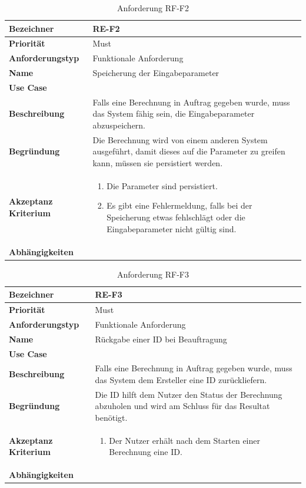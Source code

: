 \begin{table}[ht]
\centering
  \begin{tabular}{ l | p{8cm} }
	\hline
	\rowcolor{gray}
	\textbf{Bezeichner}&	\textbf{RE-F2}\\ \hline
	\textbf{Priorität} 		&	Must\\ \hline
	\textbf{Anforderungstyp}	&	Funktionale Anforderung\\ \hline
	\textbf{Name} 			&	Speicherung der Eingabeparameter\\ \hline
	\textbf{Use Case} 		&	\nameref{table:use_case_1}\\ \hline
	\textbf{Beschreibung} 	&	Falls eine Berechnung in Auftrag gegeben wurde, muss das System fähig sein, die Eingabeparameter abzuspeichern.\\ \hline
	\textbf{Begründung} 		&	Die Berechnung wird von einem anderen System ausgeführt, damit dieses auf die Parameter zu greifen kann, müssen sie persistiert werden.\\ \hline
	\textbf{Akzeptanz Kriterium}	&	\begin{enumerate}
					\item Die Parameter sind persistiert.
					\item Es gibt eine Fehlermeldung, falls bei der Speicherung etwas fehlschlägt oder die Eingabeparameter nicht gültig sind.
					\end{enumerate}
					\\ \hline
	\textbf{Abhängigkeiten} 	&	\\ \hline
  \end{tabular}
   \caption{Anforderung RF-F2}\label{table:req_3}
\end{table}

\begin{table}[ht]
\centering
  \begin{tabular}{ l | p{8cm} }
	\hline
	\rowcolor{gray}
	\textbf{Bezeichner}&	\textbf{RE-F3}\\ \hline
	\textbf{Priorität} 		&	Must\\ \hline
	\textbf{Anforderungstyp}	&	Funktionale Anforderung\\ \hline
	\textbf{Name} 			&	Rückgabe einer ID bei Beauftragung\\ \hline
	\textbf{Use Case} 		&	\nameref{table:use_case_1}\\ \hline
	\textbf{Beschreibung} 	&	Falls eine Berechnung in Auftrag gegeben wurde, muss das System dem Ersteller eine ID zurückliefern.\\ \hline
	\textbf{Begründung} 		&	Die ID hilft dem Nutzer den Status der Berechnung abzuholen und wird am Schluss für das Resultat benötigt.\\ \hline
	\textbf{Akzeptanz Kriterium}	&	\begin{enumerate}
					\item Der Nutzer erhält nach dem Starten einer Berechnung eine ID.
					\end{enumerate}
					\\ \hline
	\textbf{Abhängigkeiten} 	&	\nameref{table:req_3}\\ \hline
  \end{tabular}
   \caption{Anforderung RF-F3}\label{table:req_2}
\end{table}

